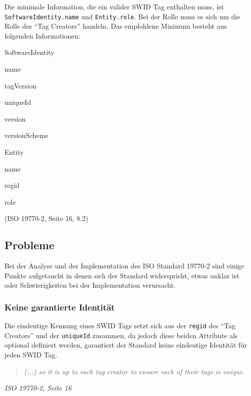 \begin{itemize}
	\item Die minimale Information, die ein valider SWID Tag enthalten muss, ist
	\texttt{SoftwareIdentity.name} und \texttt{Entity.role}. Bei der Rolle muss es
	sich um die Rolle des \enquote{Tag Creators} handeln. Das empfohlene
	Minimum besteht aus folgenden Informationen:
		\item Entity
	\end{itemize*}	
	(ISO 19770-2\cite{iso19770-2}, Seite 16, 8.2)
	
\end{itemize}


\subsection{Probleme}
Bei der Analyse und der Implementation des ISO Standard 19770-2 sind
einige Punkte aufgetaucht in denen sich der Standard widerspricht, etwas unklar
ist oder Schwierigkeiten bei der Implementation verursacht.

\subsubsection{Keine garantierte Identität}
Die eindeutige Kennung eines SWID Tags setzt sich aus der \texttt{regid} des
\enquote{Tag Creators} und der \texttt{uniqueId} zusammen, da jedoch diese
beiden Attribute als optional definiert werden, garantiert der Standard keine
eindeutige Identität für jeden SWID Tag.
\begin{quote}
\textit{(...) so it is up to each tag creator to ensure each of their tags is
unique.}
\end{quote}
\textit{ISO 19770-2\cite{iso19770-2}, Seite 16}\\

